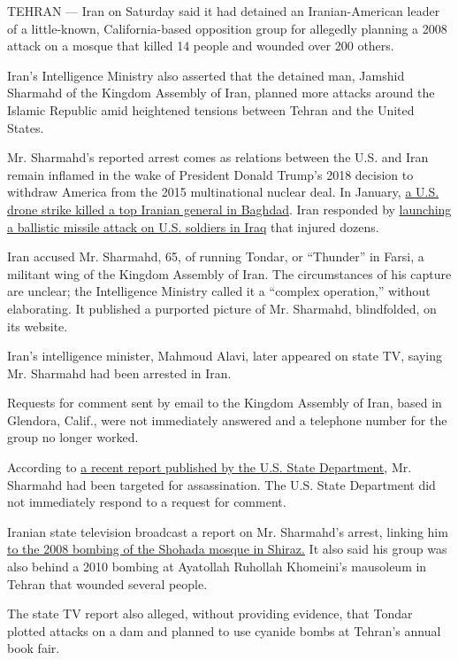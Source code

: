 TEHRAN --- Iran on Saturday said it had detained an Iranian-American
leader of a little-known, California-based opposition group for
allegedly planning a 2008 attack on a mosque that killed 14 people and
wounded over 200 others.

Iran's Intelligence Ministry also asserted that the detained man,
Jamshid Sharmahd of the Kingdom Assembly of Iran, planned more attacks
around the Islamic Republic amid heightened tensions between Tehran and
the United States.

Mr. Sharmahd's reported arrest comes as relations between the U.S. and
Iran remain inflamed in the wake of President Donald Trump's 2018
decision to withdraw America from the 2015 multinational nuclear deal.
In January, \href{https://apnews.com/5597ff0f046a67805cc233d5933a53ed}{a
U.S. drone strike killed a top Iranian general in Baghdad}. Iran
responded by
\href{https://apnews.com/add7a702258b4419d796aa5f48e577fc}{launching a
ballistic missile attack on U.S. soldiers in Iraq} that injured dozens.

Iran accused Mr. Sharmahd, 65, of running Tondar, or ``Thunder'' in
Farsi, a militant wing of the Kingdom Assembly of Iran. The
circumstances of his capture are unclear; the Intelligence Ministry
called it a ``complex operation,'' without elaborating. It published a
purported picture of Mr. Sharmahd, blindfolded, on its website.

Iran's intelligence minister, Mahmoud Alavi, later appeared on state TV,
saying Mr. Sharmahd had been arrested in Iran.

Requests for comment sent by email to the Kingdom Assembly of Iran,
based in Glendora, Calif., were not immediately answered and a telephone
number for the group no longer worked.

According to
\href{https://www.state.gov/outlaw-regime-a-chronicle-of-irans-destructive-activities/}{a
recent report published by the U.S. State Department}, Mr. Sharmahd had
been targeted for assassination. The U.S. State Department did not
immediately respond to a request for comment.

Iranian state television broadcast a report on Mr. Sharmahd's arrest,
linking him
\href{https://www.nytimes3xbfgragh.onion/2008/04/13/world/middleeast/13shiraz.html}{to
the 2008 bombing of the Shohada mosque in Shiraz.} It also said his
group was also behind a 2010 bombing at Ayatollah Ruhollah Khomeini's
mausoleum in Tehran that wounded several people.

The state TV report also alleged, without providing evidence, that
Tondar plotted attacks on a dam and planned to use cyanide bombs at
Tehran's annual book fair.

